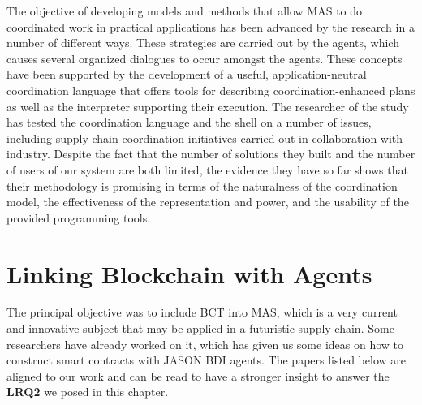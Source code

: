 \begin{itemize}[label={}]
The objective of developing models and methods that allow \ac{MAS} to do coordinated work in practical applications has been advanced by the research in a number of different ways. These strategies are carried out by the agents, which causes several organized dialogues to occur amongst the agents. These concepts have been supported by the development of a useful, application-neutral coordination language that offers tools for describing coordination-enhanced plans as well as the interpreter supporting their execution. The researcher of the study has tested the coordination language and the shell on a number of issues, including supply chain coordination initiatives carried out in collaboration with industry. Despite the fact that the number of solutions they built and the number of users of our system are both limited, the evidence they have so far shows that their methodology is promising in terms of the naturalness of the coordination model, the effectiveness of the representation and power, and the usability of the provided programming tools.
\end{itemize}

\section{Linking Blockchain with Agents}

The principal objective was to include BCT into MAS, which is a very current and innovative subject that may be applied in a futuristic supply chain. Some researchers have already worked on it, which has given us some ideas on how to construct smart contracts with JASON BDI agents. The papers listed below are aligned to our work and can be read to have a stronger insight to answer the \textbf{LRQ2} we posed in this chapter.

